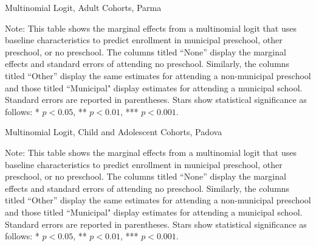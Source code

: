\begin{table}[H]
\centering
\caption{Multinomial Logit, Adult Cohorts, Parma} \label{mlogit-adult-PR}
\begin{threeparttable}

\begin{tablenotes}
\footnotesize\raggedright{Note: This table shows the marginal effects from a multinomial logit that uses baseline characteristics to predict enrollment in municipal preschool, other preschool, or no preschool. The columns titled ``None'' display the marginal effects and standard errors of attending no preschool. Similarly, the columns titled ``Other'' display the same estimates for attending a non-municipal preschool and those titled ``Municipal" display estimates for attending a municipal school. Standard errors are reported in parentheses. Stars show statistical significance as follows: * $p < 0.05$, ** $p < 0.01$, *** $p < 0.001$.}
\end{tablenotes}
\end{threeparttable}
\end{table}

\begin{table}[H]
\centering
\caption{Multinomial Logit, Child and Adolescent Cohorts, Padova} \label{mlogit-chi-ado-PD}
\begin{adjustbox}{width=\textwidth}
\begin{threeparttable}

\begin{tablenotes}
\footnotesize\raggedright{Note: This table shows the marginal effects from a multinomial logit that uses baseline characteristics to predict enrollment in municipal preschool, other preschool, or no preschool. The columns titled ``None'' display the marginal effects and standard errors of attending no preschool. Similarly, the columns titled ``Other'' display the same estimates for attending a non-municipal preschool and those titled ``Municipal" display estimates for attending a municipal school. Standard errors are reported in parentheses. Stars show statistical significance as follows: * $p < 0.05$, ** $p < 0.01$, *** $p < 0.001$.}
\end{tablenotes}
\end{threeparttable}
\end{adjustbox}
\end{table}


